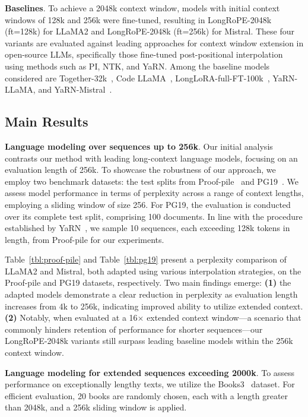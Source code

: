 \textbf{Baselines}. To achieve a 2048k context window, models with initial context windows of 128k and 256k were fine-tuned, resulting in LongRoPE-2048k (ft=128k) for LLaMA2 and LongRoPE-2048k (ft=256k) for Mistral. These four variants are evaluated against leading approaches for context window extension in open-source LLMs, specifically those fine-tuned post-positional interpolation using methods such as PI, NTK, and YaRN. Among the baseline models considered are Together-32k~\cite{together}, Code LLaMA~\cite{codellama}, LongLoRA-full-FT-100k~\cite{longlora}, YaRN-LLaMA, and YaRN-Mistral~\cite{yarn}.

\subsection{Main Results}

\label{sec:mainresult}
\textbf{Language modeling over sequences up to 256k}. Our initial analysis contrasts our method with leading long-context language models, focusing on an evaluation length of 256k. To showcase the robustness of our approach, we employ two benchmark datasets: the test splits from Proof-pile~\cite{pg19} and PG19~\cite{pile}. We assess model performance in terms of perplexity across a range of context lengths, employing a sliding window of size 256. For PG19, the evaluation is conducted over its complete test split, comprising 100 documents. In line with the procedure established by YaRN~\cite{yarn}, we sample 10 sequences, each exceeding 128k tokens in length, from Proof-pile for our experiments.

Table~\ref{tbl:proof-pile} and Table~\ref{tbl:pg19} present a perplexity comparison of LLaMA2 and Mistral, both adapted using various interpolation strategies, on the Proof-pile and PG19 datasets, respectively. Two main findings emerge: \textbf{(1)} the adapted models demonstrate a clear reduction in perplexity as evaluation length increases from 4k to 256k, indicating improved ability to utilize extended context. \textbf{(2)} Notably, when evaluated at a 16$\times$ extended context window—a scenario that commonly hinders retention of performance for shorter sequences—our LongRoPE-2048k variants still surpass leading baseline models within the 256k context window.

\textbf{Language modeling for extended sequences exceeding 2000k}. To assess performance on exceptionally lengthy texts, we utilize the Books3~\cite{pile} dataset. For efficient evaluation, 20 books are randomly chosen, each with a length greater than 2048k, and a 256k sliding window is applied.

